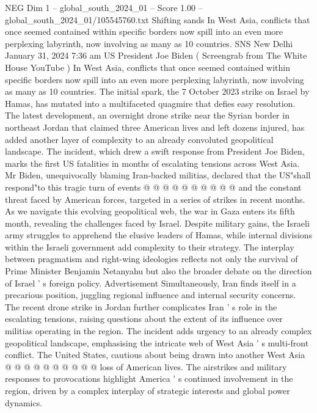 \begin{textsample}{NEG Dim 1 – global\_south\_2024\_01 – Score 1.00 – global\_south\_2024\_01/105545760.txt}  \label{ex:f1_neg_334}
Shifting sands In West Asia, conflicts that once seemed contained within specific borders now spill into an even more perplexing labyrinth, now involving as many as 10 countries.
SNS New Delhi January 31, 2024 7:36 am US President Joe Biden ( Screengrab from The White House YouTube ) In West Asia, conflicts that once seemed contained within specific borders now spill into an even more perplexing labyrinth, now involving as many as 10 countries.
The initial spark, the 7 October 2023 strike on Israel by Hamas, has mutated into a multifaceted quagmire that defies easy resolution.
The latest development, an overnight drone strike near the Syrian border in northeast Jordan that claimed three American lives and left dozens injured, has added another layer of complexity to an already convoluted geopolitical landscape.
The incident, which drew a swift response from President Joe Biden, marks the first US fatalities in months of escalating tensions across West Asia.
Mr Biden, unequivocally blaming Iran-backed militias, declared that the US"shall respond"to this tragic turn of events @ @ @ @ @ @ @ @ @ @ and the constant threat faced by American forces, targeted in a series of strikes in recent months.
As we navigate this evolving geopolitical web, the war in Gaza enters its fifth month, revealing the challenges faced by Israel.
Despite military gains, the Israeli army struggles to apprehend the elusive leaders of Hamas, while internal divisions within the Israeli government add complexity to their strategy.
The interplay between pragmatism and right-wing ideologies reflects not only the survival of Prime Minister Benjamin Netanyahu but also the broader debate on the direction of Israel ' s foreign policy.
Advertisement Simultaneously, Iran finds itself in a precarious position, juggling regional influence and internal security concerns.
The recent drone strike in Jordan further complicates Iran ' s role in the escalating tensions, raising questions about the extent of its influence over militias operating in the region.
The incident adds urgency to an already complex geopolitical landscape, emphasising the intricate web of West Asia ' s multi-front conflict.
The United States, cautious about being drawn into another West Asia @ @ @ @ @ @ @ @ @ @ loss of American lives.
The airstrikes and military responses to provocations highlight America ' s continued involvement in the region, driven by a complex interplay of strategic interests and global power dynamics.

\end{textsample}

